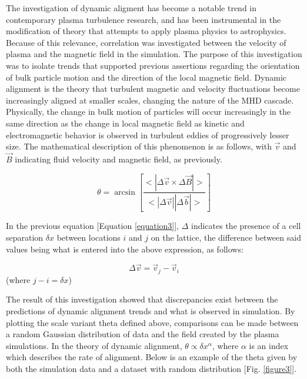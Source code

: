 \documentclass[journal, a4paper]{IEEEtran}
\begin{document}
The investigation of dynamic aligment has become a notable trend in contemporary plasma turbulence research\cite{boldyrev2}, and has been instrumental in the modification of theory that attempts to apply plasma physics to astrophysics\cite{goldreich}. Because of this relevance, correlation was investigated between the velocity of plasma and the magnetic field in the simulation. The purpose of this investigation was to isolate trends that supported previous assertions\cite{boldyrev} regarding the orientation of bulk particle motion and the direction of the local magnetic field. Dynamic alignment is the theory that turbulent magnetic and velocity fluctuations become increasingly aligned at smaller scales, changing the nature of the MHD cascade. Physically, the change in bulk motion of particles will occur increasingly in the same direction as the change in local magnetic field as kinetic and electromagnetic behavior is observed in turbulent eddies of progressively lesser size. The mathematical description of this phenomenon is as follows, with $\vec{v}$ and $\vec{B}$ indicating fluid velocity and magnetic field, as previously.

\vspace{.1cm}
\begin{equation}
\theta=\arcsin[\frac{<|\Delta \vec{v} \times \Delta \vec{B}|>}{<|\Delta \vec{v}||\Delta \vec{b}|>}]
\label{equation3}
\end{equation}
\vspace{.1cm}

In the previous equation [Equation \eqref{equation3}], $\Delta$ indicates the presence of a cell separation $\delta x$ between locations $i$ and $j$ on the lattice, the difference between said values being what is entered into the above expression, as follows:

\vspace{.1cm}
\begin{equation}
\Delta \vec{v}=\vec{v}_j-\vec{v}_i
\label{equation4}
\end{equation}
{\centering (where $j-i=\delta x$)\\}
\vspace{.6cm}

The result of this investigation showed that discrepancies exist between the predictions of dynamic alignment trends and what is observed in simulation. By plotting the scale variant theta defined above, comparisons can be made between a random Gaussian distribution of data and the field created by the plasma simulations. In the theory of dynamic alignment, $\theta \propto \delta x^\alpha$, where $\alpha$ is an index which describes the rate of alignment. Below is an example of the theta given by both the simulation data and a dataset with random distribution [Fig. \ref{figure3}].
\end{document}
